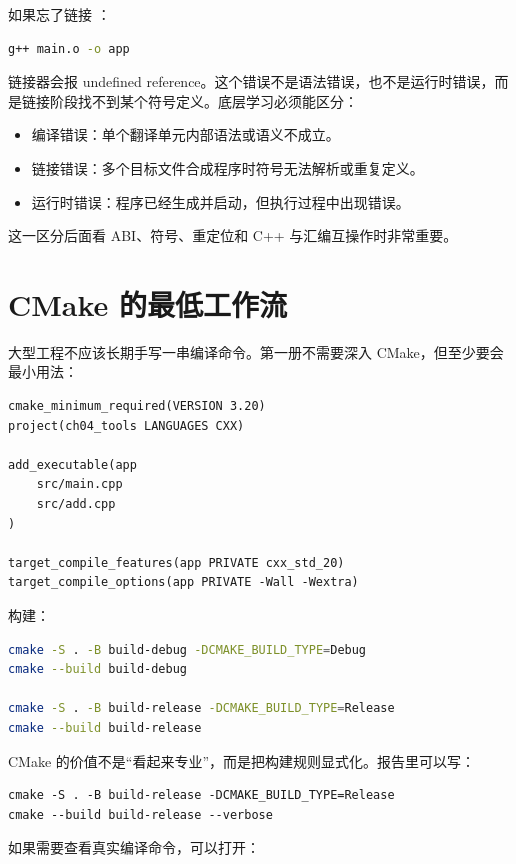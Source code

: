如果忘了链接 ：

\begin{lstlisting}[language=bash]
g++ main.o -o app
\end{lstlisting}

链接器会报 undefined reference。这个错误不是语法错误，也不是运行时错误，而是链接阶段找不到某个符号定义。底层学习必须能区分：

\begin{itemize}
  \item 编译错误：单个翻译单元内部语法或语义不成立。
  \item 链接错误：多个目标文件合成程序时符号无法解析或重复定义。
  \item 运行时错误：程序已经生成并启动，但执行过程中出现错误。
\end{itemize}

这一区分后面看 ABI、符号、重定位和 C++ 与汇编互操作时非常重要。

\section{CMake 的最低工作流}

大型工程不应该长期手写一串编译命令。第一册不需要深入 CMake，但至少要会最小用法：

\begin{lstlisting}
cmake_minimum_required(VERSION 3.20)
project(ch04_tools LANGUAGES CXX)

add_executable(app
    src/main.cpp
    src/add.cpp
)

target_compile_features(app PRIVATE cxx_std_20)
target_compile_options(app PRIVATE -Wall -Wextra)
\end{lstlisting}

构建：

\begin{lstlisting}[language=bash]
cmake -S . -B build-debug -DCMAKE_BUILD_TYPE=Debug
cmake --build build-debug

cmake -S . -B build-release -DCMAKE_BUILD_TYPE=Release
cmake --build build-release
\end{lstlisting}

CMake 的价值不是“看起来专业”，而是把构建规则显式化。报告里可以写：

\begin{lstlisting}
cmake -S . -B build-release -DCMAKE_BUILD_TYPE=Release
cmake --build build-release --verbose
\end{lstlisting}

如果需要查看真实编译命令，可以打开：

